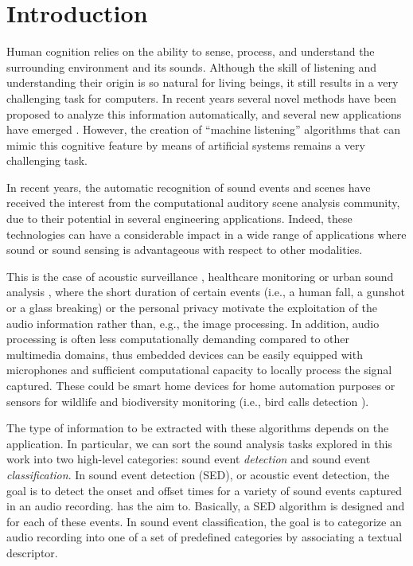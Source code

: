 \chapter{Introduction}\label{ch:intro}

Human cognition relies on the ability to sense, process, and understand the surrounding environment and its sounds.
Although the skill of listening and understanding their origin is so natural for living beings, it still results in a very challenging task for computers. In recent years several novel methods have been proposed to analyze this information automatically, and several new applications have emerged \cite{virtanen2018computational}. However, the creation of ``machine listening'' algorithms that can mimic this cognitive feature by means of artificial systems remains a very challenging task. 

In recent years, the automatic recognition of sound events and scenes have received the interest from the computational auditory scene analysis community, due to their potential in several engineering applications. Indeed, these technologies can have a considerable impact in a wide range of applications where sound or sound sensing is advantageous with respect to other modalities. 


This is the case of acoustic surveillance \cite{crocco2016audio}, healthcare monitoring \cite{peng2009healthcare, foggia2015reliable} or urban sound analysis \cite{salamon2017deep}, where the short duration of certain events (i.e., a human fall, a gunshot or a glass breaking) or the personal privacy motivate the exploitation of the audio information rather than, e.g., the image processing. 
In addition, audio processing is often less computationally demanding compared to other multimedia domains, %
thus embedded devices can be easily equipped with microphones and sufficient computational capacity to locally process the signal captured. 
These could be smart home devices for home automation purposes or sensors for wildlife and biodiversity monitoring (i.e., bird calls detection \cite{grill2017two}).


The type of information to be extracted with these algorithms depends on the application. In particular, we can sort the sound analysis tasks explored in this work into two high-level categories: sound event \textit{detection} and sound event \textit{classification}.
In sound event detection (SED), or acoustic event detection, the goal is to detect the onset and offset times for a variety of sound events captured in an audio recording.
has the aim to. Basically, a SED algorithm is designed and  for each of these events.
In sound event classification, the goal is to categorize an audio recording into one of a set of predefined categories by associating a textual descriptor.




